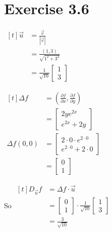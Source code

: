\documentclass[11pt,fleqn]{book} %
\begin{document}
\section*{Exercise 3.6}

\begin{minipage}[t]{0.3\linewidth}
    $\begin{aligned}[t]
        \vec{u} & = \frac{\vec{v}}{| \vec{v} |}                             \\
                & = \frac{(1, 3)}{\sqrt{1^2 + 3^2}}                         \\
                & = \frac{1}{\sqrt{10}}\begin{bmatrix} 1 \\ 3 \end{bmatrix}
    \end{aligned}$
\end{minipage}
\begin{minipage}[t]{0.3\linewidth}
    $\begin{aligned}[t]
        \Delta f 
        & = \left( \frac{\partial f}{\partial x}, \frac{\partial f}{\partial y} \right) \\
        & = \begin{bmatrix} 2ye^{2x} \\ e^{2x} + 2y \end{bmatrix} \\
        \Delta f(0, 0) 
        & = \begin{bmatrix}
            2 \cdot 0 \cdot e^{2 \cdot 0} \\
            e^{2 \cdot 0} + 2 \cdot 0
        \end{bmatrix} \\
        &= \begin{bmatrix} 0 \\ 1 \end{bmatrix}
    \end{aligned}$

\end{minipage}
\begin{minipage}[t]{0.3\linewidth}
    So $\begin{aligned}[t]
        D_{\vec{u}} f 
        & = \Delta f \cdot \vec{u} \\
        & = \begin{bmatrix} 0 \\ 1 \end{bmatrix} \cdot \frac{1}{\sqrt{10}} \begin{bmatrix} 1 \\ 3 \end{bmatrix} \\
        & = \frac{3}{\sqrt{10}}
    \end{aligned}$
\end{minipage}
\end{document}
